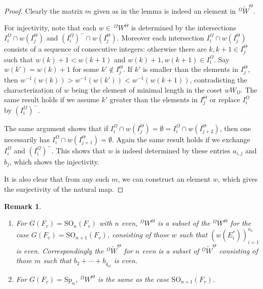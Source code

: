 \documentclass[12pt,oneside,reqno]{amsart}
\theoremstyle{plain}
\newtheorem{remark}[theorem]{Remark}
\begin{document}
	\begin{proof}
		Clearly the matrix $m$ given as in the lemma is indeed an element in
		$^\Omega\widetilde{W}^\Theta$.
		
		
		
		For injectivity, note that each
		$w\in\,^\Omega W^\Theta$ is determined by the intersections	$I_i^\Omega\cap w(I_j^\Theta)$	and $(I_i^\Omega)^-\cap w(I_j^\Theta)$.
		Moreover each intersection $I_i^\Omega\cap w(I_j^\Theta)$ consists of a sequence of consecutive integers: otherwise there are $k,k+1\in I_j^\Theta$
		such that $w(k)+1<w(k+1)$ and $w(k)+1,w(k+1)\in I_i^\Omega$. Say
		$w(k')=w(k)+1$ for some $k'\notin I_j^\Theta$. If $k'$ is smaller than the elements in $I_j^\Theta$, then $w^{-1}(w(k))>w^{-1}(w(k'))<w^{-1}(w(k+1))$, contradicting the characterization of $w$ being the element of minimal length in the coset
		$wW_\Omega$. The same result holds if we assume $k'$ greater than the elements in $I_j^\Theta$ or replace $I_i^\Omega$ by $(I_i^\Omega)^-$.
		
		
		
		
		
		The same argument shows that if $I_i^\Omega\cap w(I_j^\Theta)=\emptyset
		=I_i^\Omega\cap w(I_{j+2}^\Theta)$, then one necessarily has	$I_i^\Omega\cap w(I_{j+1}^\Theta)=\emptyset$. Again the same result holds if we exchange $I_i^\Omega$ and $(I_i^\Omega)^-$. This shows that
		$w$ is indeed determined by these entries $a_{i,j}$ and $b_j$, which shows the injectivity.
		
		
		
		It is also clear that from any such $m$, we can construct an element $w$, which gives the surjectivity of the natural map.
	\end{proof}
	\begin{remark}\rm
		\begin{enumerate}
			\item
			For $G(F_v)=\mathrm{SO}_n(F_v)$ with $n$ even,
			$^\Omega W^\Theta$
			is a subset of
			the $^\Omega W^\Theta$
			for the case $G(F_v)=\mathrm{SO}_{n+1}(F_v)$,
			consisting of those $w$
			such that
			$(w(E_i^\ast))_{i=1}^{n_{\mathrm{s}}}$
			is even.
			Correspondingly the
			$^\Omega\widetilde{W}^\Theta$
			for $n$ even is a subset of
			$^\Omega\widetilde{W}^\Theta$
			consisting of those $m$
			such that
			$b_2+\cdots+b_{q_{\Omega}}$
			is even.
			
			
			
			\item 
			For $G(F_v)=\mathrm{Sp}_n$, $^\Omega W^\Theta$ is the same as the case $\mathrm{SO}_{n+1}(F_v)$.
		\end{enumerate}
		
	\end{remark}
	
\end{document}
